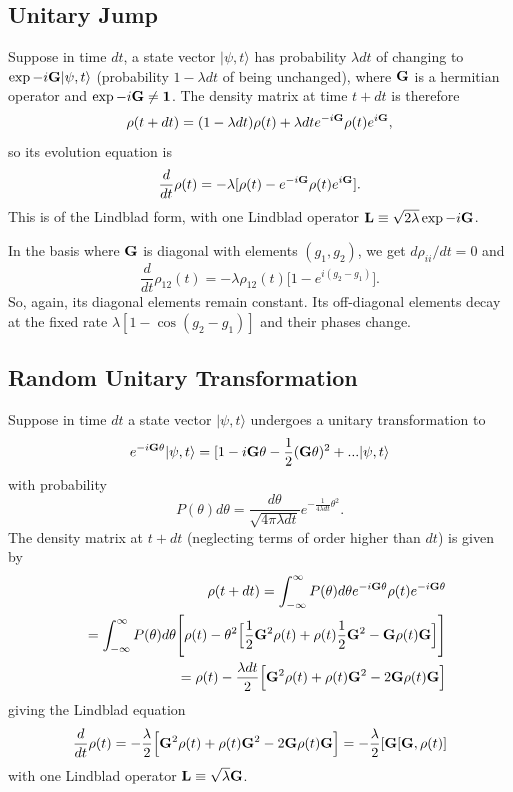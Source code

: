 \documentclass[aps,pra,twocolumn,amssymb, amsfonts,amsmath,showpacs, superscriptaddress]{revtex4}
\begin{document}
\subsection{Unitary Jump}

Suppose in time $dt$, a state vector $|\psi, t\rangle$ has probability $\lambda dt$ of changing to $\exp-i{\bf G}|\psi, t\rangle$ (probability $1-\lambda dt$ of being unchanged), where 
${\bf G}$ is a hermitian operator and $\exp-i{\bf G}\neq{\bf 1}$.  The density matrix at time $t+dt$ is therefore           
\[
	{\bf \rho}(t+dt)=(1-\lambda dt){\bf \rho}(t)+\lambda dte^{-i{\bf G}}{\bf \rho}(t)e^{i{\bf G}}, 
\]
\noindent so its evolution equation is  
\[
		\frac{d}{dt}{\bf \rho}(t)=-\lambda[{\bf \rho}(t)-e^{-i{\bf G}}{\bf \rho}(t)e^{i{\bf G}}].
\]
\noindent This is of the Lindblad form, with one Lindblad operator ${\bf L}\equiv  \sqrt{2\lambda}\exp{-i{\bf G}}$. 

In the basis where ${\bf G}$ is diagonal with elements $(g_{1},g_{2})$, we get 
$d\rho_{ii}/dt=0$ and
\[
\frac{d}{dt}\rho_{12}(t)=-\lambda\rho_{12}(t)\Big[1-e^{i(g_{2}-g_{1})}\Big]. 
\]
\noindent So, again, its diagonal elements remain constant.   Its off-diagonal elements  decay at the fixed rate $\lambda[1-\cos(g_{2}-g_{1})]$ 
and their phases change. 
 
\subsection{Random Unitary Transformation}
Suppose in time $dt$ a state vector $|\psi,t\rangle$ undergoes a unitary transformation to
\[ 
	e^{-i{\bf G}\theta}|\psi,t\rangle=[1-i{\bf G}\theta -\frac{1}{2}({\bf G}\theta)^{2}+ ...|\psi,t\rangle
\]
 with probability 
\[
P(\theta)d\theta = \frac{d\theta}{\sqrt{4\pi\lambda dt}}e^{-\frac{1}{4\lambda dt}\theta^{2}}. 
\] 
\noindent  The density matrix at $t+dt$ (neglecting terms of order higher than $dt$) is given by
\begin{eqnarray}
&&{\bf \rho}(t+dt)=\int_{-\infty}^{\infty}P(\theta)d\theta e^{-i{\bf G}\theta}{\bf \rho}(t)e^{-i{\bf G}\theta}\nonumber\\
&&=\int_{-\infty}^{\infty}P(\theta)d\theta\Bigg[{\bf \rho}(t)-\theta^{2}\Big[\frac{1}{2}{\bf G}^{2}{\bf \rho}(t)+{\bf \rho}(t)\frac{1}{2}{\bf G}^{2}-{\bf G}{\bf \rho}(t){\bf G}\Big]\Bigg]\nonumber\\
&&={\bf \rho}(t)-\frac{\lambda dt}{2}\Big[{\bf G}^{2}{\bf \rho}(t)+{\bf \rho}(t){\bf G}^{2}-2{\bf G}{\bf \rho}(t){\bf G}\Big]\nonumber
\end{eqnarray}
\noindent giving the Lindblad equation
\[
\frac{d}{dt}{\bf \rho}(t)=-\frac{\lambda}{2}\Big[{\bf G}^{2}{\bf \rho}(t)+{\bf \rho}(t){\bf G}^{2}-2{\bf G}{\bf \rho}(t){\bf G}\Big]=-\frac{\lambda}{2}[{\bf G}[{\bf G}, {\bf \rho}(t) ]
\]
\noindent with one Lindblad operator ${\bf L}\equiv \sqrt{\lambda} {\bf G}$.
\end{document}
